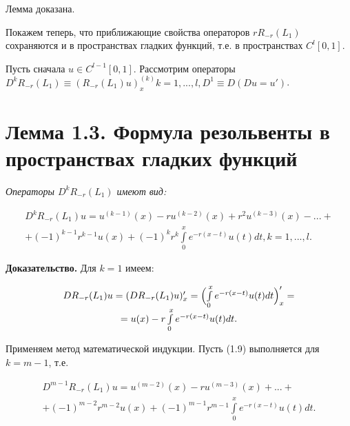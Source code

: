 Лемма доказана.

Покажем теперь, что приближающие свойства операторов $ rR_{-r}(L_1) $ сохраняются и в пространствах гладких функций, т.е. в пространствах $ C^l[0,1] $.

Пусть сначала $ u \in C^{l-1}[0,1] $. Рассмотрим операторы $ D^kR_{-r}(L_1) \equiv (R_{-r}(L_1)u)_x^{(k)} k = 1,...,l, D^1 \equiv D (Du = u')$.

\section{Лемма 1.3. Формула резольвенты в пространствах гладких функций}
\label{lemma1.3}

\textit{Операторы $ D^kR_{-r}(L_1) $ имеют вид:}

\begin{equation}
\begin{array}{c}

D^kR_{-r}(L_1)u = u^{(k-1)}(x) - ru^{(k-2)}(x) + r^2u^{(k-3)}(x) - ... + \\
+ (-1)^{k-1}r^{k-1}u(x) + (-1)^kr^k\int\limits_0^x e^{-r(x-t)}u(t)dt, k = 1,...,l.

\end{array}
\end{equation}

\textbf{Доказательство.} Для $ k = 1 $ имеем:

\begin{equation}
\begin{array}{c}
\nonumber

DR_{-r}(L_1)u = (DR_{-r}(L_1)u)_x' = \Bigl( \int\limits_0^x e^{-r(x-t)}u(t)dt \Bigr)_x' = \\
= u(x) -r\int\limits_0^x e^{-r(x-t)}u(t)dt.

\end{array}
\end{equation}

Применяем метод математической индукции. Пусть (1.9) выполняется для $ k = m - 1 $, т.е.

\begin{equation}
\begin{array}{c}
\nonumber

D^{m-1}R_{-r}(L_1)u = u^{(m-2)}(x) - ru^{(m-3)}(x) + ... + \\
+ (-1)^{m-2}r^{m-2}u(x) + (-1)^{m-1}r^{m-1}\int\limits_0^x e^{-r(x-t)}u(t)dt.

\end{array}
\end{equation}

